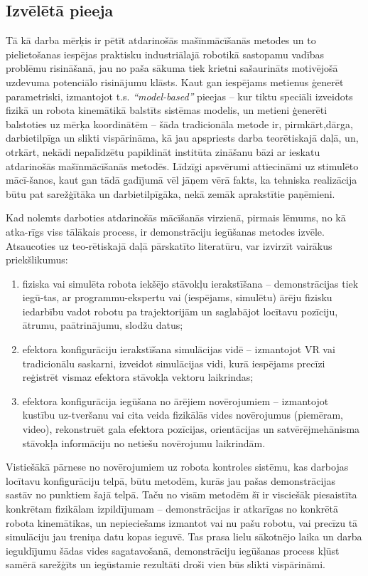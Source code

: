 \documentclass[12pt, a4paper]{article}
\numberwithin{equation}{section} %
\begin{document}
\subsection{Izvēlētā pieeja}

Tā kā darba mērķis ir pētīt atdarinošās mašīnmācīšanās metodes un to pielietošanas iespējas praktisku industriālajā robotikā sastopamu vadības problēmu risināšanā, jau no paša sākuma tiek krietni sašaurināts motivējošā uzdevuma potenciālo risinājumu klāsts. Kaut gan iespējams metienus ģenerēt parametriski, izmantojot t.s. \textit{``model-based''} pieejas -- kur tiktu speciāli izveidots fizikā un robota kinemātikā balstīts sistēmas modelis, un metieni ģenerēti balstoties uz mērķa koordinātēm -- šāda tradicionāla metode ir, pirmkārt,dārga, darbietilpīga un slikti vispārināma, kā jau apspriests darba teorētiskajā daļā, un, otrkārt, nekādi nepalīdzētu papildināt institūta zināšanu bāzi ar ieskatu atdarinošās mašīnmācīšanās metodēs. Līdzīgi apsvērumi attiecināmi uz stimulēto mācī-šanos, kaut gan tādā gadījumā vēl jāņem vērā fakts, ka tehniska realizācija būtu pat sarežģītāka un darbietilpīgāka, nekā zemāk aprakstītie paņēmieni.

Kad nolemts darboties atdarinošās mācīšanās virzienā, pirmais lēmums, no kā atka-rīgs viss tālākais process, ir demonstrāciju iegūšanas metodes izvēle. Atsaucoties uz teo-rētiskajā daļā pārskatīto literatūru, var izvirzīt vairākus priekšlikumus:

\begin{enumerate}
    \item fiziska vai simulēta robota iekšējo stāvokļu ierakstīšana -- demonstrācijas tiek iegū-tas, ar programmu-ekspertu vai (iespējams, simulētu) ārēju fizisku iedarbību vadot robotu pa trajektorijām un saglabājot locītavu pozīciju, ātrumu, paātrinājumu, slodžu datus;
    \item efektora konfigurāciju ierakstīšana simulācijas vidē -- izmantojot VR vai tradicionālu saskarni, izveidot simulācijas vidi, kurā iespējams precīzi reģistrēt vismaz efektora stāvokļa vektoru laikrindas;
    \item efektora konfigurācija iegūšana no ārējiem novērojumiem -- izmantojot kustību uz-tveršanu vai cita veida fizikālās vides novērojumus (piemēram, video), rekonstruēt gala efektora pozīcijas, orientācijas un satvērējmehānisma stāvokļa informāciju no netiešu novērojumu laikrindām.
\end{enumerate}

Vistiešākā pārnese no novērojumiem uz robota kontroles sistēmu, kas darbojas locītavu konfigurāciju telpā, būtu metodēm, kurās jau pašas demonstrācijas sastāv no punktiem šajā telpā. Taču no visām metodēm šī ir visciešāk piesaistīta konkrētam fizikālam izpildījumam -- demonstrācijas ir atkarīgas no konkrētā robota kinemātikas, un nepieciešams izmantot vai nu pašu robotu, vai precīzu tā simulāciju jau treniņa datu kopas ieguvē. Tas prasa lielu sākotnējo laika un darba ieguldījumu šādas vides sagatavošanā, demonstrāciju iegūšanas process kļūst samērā sarežģīts un iegūstamie rezultāti droši vien būs slikti vispārināmi.
\end{document}
